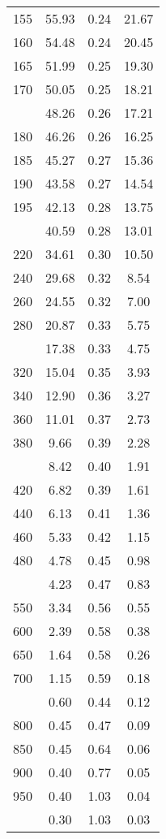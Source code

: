 \begin{table}[ht]
\begin{tabular}{lccc}
  155 & 55.93 & 0.24 & 21.67 \\ 
  160 & 54.48 & 0.24 & 20.45 \\ 
  165 & 51.99 & 0.25 & 19.30 \\ 
  170 & 50.05 & 0.25 & 18.21 \\ 
   \addlinespace
175 & 48.26 & 0.26 & 17.21 \\ 
  180 & 46.26 & 0.26 & 16.25 \\ 
  185 & 45.27 & 0.27 & 15.36 \\ 
  190 & 43.58 & 0.27 & 14.54 \\ 
  195 & 42.13 & 0.28 & 13.75 \\ 
   \addlinespace
200 & 40.59 & 0.28 & 13.01 \\ 
  220 & 34.61 & 0.30 & 10.50 \\ 
  240 & 29.68 & 0.32 & 8.54 \\ 
  260 & 24.55 & 0.32 & 7.00 \\ 
  280 & 20.87 & 0.33 & 5.75 \\ 
   \addlinespace
300 & 17.38 & 0.33 & 4.75 \\ 
  320 & 15.04 & 0.35 & 3.93 \\ 
  340 & 12.90 & 0.36 & 3.27 \\ 
  360 & 11.01 & 0.37 & 2.73 \\ 
  380 & 9.66 & 0.39 & 2.28 \\ 
   \addlinespace
400 & 8.42 & 0.40 & 1.91 \\ 
  420 & 6.82 & 0.39 & 1.61 \\ 
  440 & 6.13 & 0.41 & 1.36 \\ 
  460 & 5.33 & 0.42 & 1.15 \\ 
  480 & 4.78 & 0.45 & 0.98 \\ 
   \addlinespace
500 & 4.23 & 0.47 & 0.83 \\ 
  550 & 3.34 & 0.56 & 0.55 \\ 
  600 & 2.39 & 0.58 & 0.38 \\ 
  650 & 1.64 & 0.58 & 0.26 \\ 
  700 & 1.15 & 0.59 & 0.18 \\ 
   \addlinespace
750 & 0.60 & 0.44 & 0.12 \\ 
  800 & 0.45 & 0.47 & 0.09 \\ 
  850 & 0.45 & 0.64 & 0.06 \\ 
  900 & 0.40 & 0.77 & 0.05 \\ 
  950 & 0.40 & 1.03 & 0.04 \\ 
   \addlinespace
1000 & 0.30 & 1.03 & 0.03 \\ 
   \bottomrule
\end{tabular}
\end{table}
